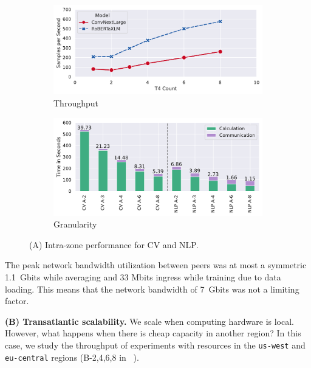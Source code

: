 \begin{figure}
    \begin{subfigure}[c]{0.25\textwidth}
        \includegraphics[width=\textwidth]{figures/misc/geo-distributed-performance-US}
        \vspace{-18pt}
        \caption{Throughput}
        \label{fig:geo-dist-us-only-throughput}
    \end{subfigure}
    \begin{subfigure}[c]{0.22\textwidth}
        \includegraphics[width=\textwidth]{figures/misc/geo-distributed-performance-US-granularity}  
        \vspace{-18pt}
        \caption{Granularity}
        \label{fig:geo-dist-us-only-granularity}
    \end{subfigure}
    \vspace{-10pt}
    \caption{(A) Intra-zone performance for CV and NLP.}
    \label{fig:geo-dist-us-only}
    \vspace*{-5mm}
\end{figure}

The peak network bandwidth utilization between peers was at most a symmetric 1.1~Gbits while averaging and 33 Mbits ingress while training due to data loading.
This means that the network bandwidth of 7~Gbits was not a limiting factor.

\textbf{(B) Transatlantic scalability.} We scale when computing hardware is local. However, what happens when there is cheap capacity in another region? In this case, we study the throughput of experiments with resources in the \texttt{us-west} and \texttt{eu-central} regions (B-2,4,6,8 in ~).

